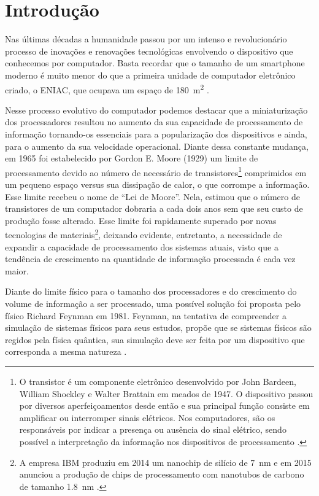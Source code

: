 \chapter{Introdução}

Nas últimas décadas a humanidade passou por um intenso e revolucionário processo de inovações e renovações tecnológicas envolvendo o dispositivo que conhecemos por computador. Basta recordar que o tamanho de um smartphone moderno é muito menor do que a primeira unidade de computador eletrônico criado, o ENIAC, que ocupava um espaço de \SI{180}{\square\meter} \cite{eniac}.

Nesse processo evolutivo do computador podemos destacar que a miniaturização dos processadores resultou no aumento da sua capacidade de processamento de informação tornando-os essenciais para a popularização dos dispositivos e ainda, para o aumento da sua velocidade operacional. Diante dessa constante mudança, em 1965 foi estabelecido por Gordon E. Moore (1929) um limite de processamento devido ao número de necessário de transistores\footnote{O transistor é um componente eletrônico desenvolvido por John Bardeen, William Shockley e Walter Brattain em meados de 1947. O dispositivo passou por diversos aperfeiçoamentos desde então e sua principal função consiste em amplificar ou interromper sinais elétricos. Nos computadores, são os responsáveis por indicar a presença ou ausência do sinal elétrico, sendo possível a interpretação da informação nos dispositivos de processamento \cite{transistor}.} comprimidos em um pequeno espaço versus sua dissipação de calor, o que corrompe a informação. Esse limite recebeu o nome de ``Lei de Moore''. Nela, \textcite{moore} estimou que o número de transistores de um computador dobraria a cada dois anos sem que seu custo de produção fosse alterado. Esse limite foi rapidamente superado por novas tecnologias de materiais\footnote{A empresa IBM produziu em 2014 um nanochip de silício de \SI{7}{\nano\meter} e em 2015 anunciou a produção de chips de processamento com nanotubos de carbono de tamanho \SI{1.8}{\nano\meter} \cite{chipibm}.}, deixando evidente, entretanto, a necessidade de expandir a capacidade de processamento dos sistemas atuais, visto que a tendência de crescimento na quantidade de informação processada é cada vez maior.

Diante do limite físico para o tamanho dos processadores e do crescimento do volume de informação a ser processado, uma possível solução foi proposta pelo físico Richard Feynman em 1981. Feynman, na tentativa de compreender a simulação de sistemas físicos para seus estudos, propõe que se sistemas físicos são regidos pela física quântica, sua simulação deve ser feita por um dispositivo que corresponda a mesma natureza \cite{caldeira}.

